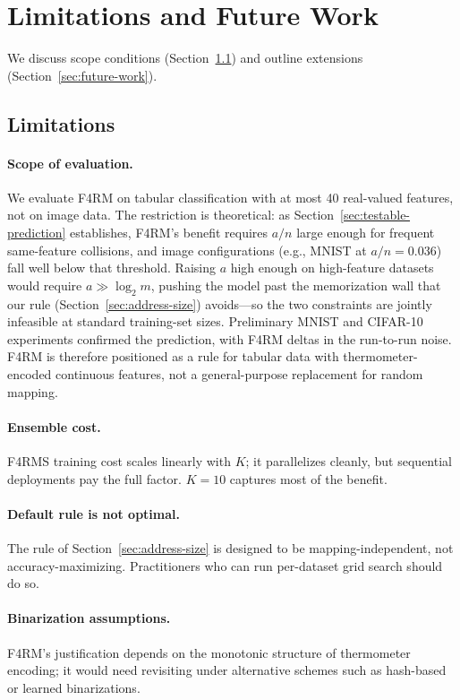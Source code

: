 \documentclass[runningheads]{llncs}
\begin{document}
\section{Limitations and Future Work}
\label{sec:limitations}

We discuss scope conditions (Section~\ref{sec:limitations-details}) and outline extensions (Section~\ref{sec:future-work}).

\subsection{Limitations}
\label{sec:limitations-details}

\paragraph{Scope of evaluation.} We evaluate F4RM on tabular classification with at most 40 real-valued features, not on image data. The restriction is theoretical: as Section~\ref{sec:testable-prediction} establishes, F4RM's benefit requires $a/n$ large enough for frequent same-feature collisions, and image configurations (e.g., MNIST at $a/n = 0.036$) fall well below that threshold. Raising $a$ high enough on high-feature datasets would require $a \gg \log_2 m$, pushing the model past the memorization wall that our rule (Section~\ref{sec:address-size}) avoids---so the two constraints are jointly infeasible at standard training-set sizes. Preliminary MNIST and CIFAR-10 experiments confirmed the prediction, with F4RM deltas in the run-to-run noise. F4RM is therefore positioned as a rule for tabular data with thermometer-encoded continuous features, not a general-purpose replacement for random mapping.

\paragraph{Ensemble cost.} F4RMS training cost scales linearly with $K$; it parallelizes cleanly, but sequential deployments pay the full factor. $K=10$ captures most of the benefit.

\paragraph{Default rule is not optimal.} The rule of Section~\ref{sec:address-size} is designed to be mapping-independent, not accuracy-maximizing. Practitioners who can run per-dataset grid search should do so.

\paragraph{Binarization assumptions.} F4RM's justification depends on the monotonic structure of thermometer encoding; it would need revisiting under alternative schemes such as hash-based or learned binarizations.
\end{document}
